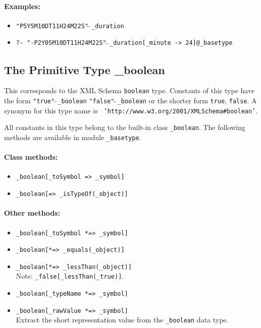 \documentclass[11pt]{article}
\begin{document}
\paragraph{Examples:}
\begin{itemize}
\item {\tt "P5Y5M10DT11H24M22S"$\hat{~}\hat{~}$\_duration} 
\item {\tt ?- "-P2Y05M10DT11H24M22S"$\hat{~}\hat{~}$\_duration[\_minute -> 24]@\_basetype}
\end{itemize}

\subsection{ The Primitive Type \_boolean}

This corresponds to the XML Schema {\tt boolean}  type.
Constants of this type have the form 
{\tt "true"$\hat{~}\hat{~}$\_boolean}  {\tt "false"$\hat{~}\hat{~}$\_boolean} 
or the shorter form {\tt true}, {\tt false}. 
A synonym for this type name is {\tt
  'http://www.w3.org/2001/XMLSchema\#boolean'}.

All constants in this type belong to the built-in class {\tt \_boolean}. 
The following methods are available in module {\tt \_basetype}. 
\paragraph{Class methods:}
\begin{itemize}
    \item {\tt \_boolean[\_toSymbol => \_symbol]}  
    \item {\tt \_boolean[=> \_isTypeOf(\_object)]}  
\end{itemize}

\paragraph{Other methods:}
\begin{itemize}
\item {\tt \_boolean[\_toSymbol *=> \_symbol]}  
\item {\tt \_boolean[*=> \_equals(\_object)]}  
\item {\tt \_boolean[*=> \_lessThan(\_object)]}\\  
  Note: {\tt \_false[\_lessThan(\_true)]}. 
\item {\tt \_boolean[\_typeName *=> \_symbol]}  
\item {\tt \_boolean[\_rawValue *=> \_symbol]}
  \\
  Extract the short representation value from
  the {\tt \_boolean} data type. 
\end{itemize}
\end{document}
